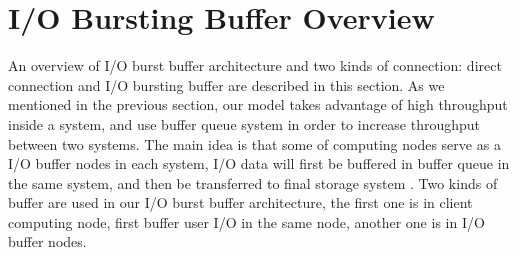\section{I/O Bursting Buffer Overview}
\label{sec:burst_buffer}


An overview of I/O burst buffer architecture and two kinds of connection: direct connection and I/O bursting buffer are described in this section.
As we mentioned in the previous section, our model takes advantage of high throughput inside a system, and use buffer queue system in order to increase throughput between two systems.
The main idea is that some of computing nodes serve as a I/O buffer nodes in each system, I/O data will first be buffered in buffer queue in the same system, and then be transferred to final storage system
.
Two kinds of buffer are used in our I/O burst buffer architecture, the first one is in client computing node, first buffer user I/O in the same node, another one is in I/O buffer nodes.




